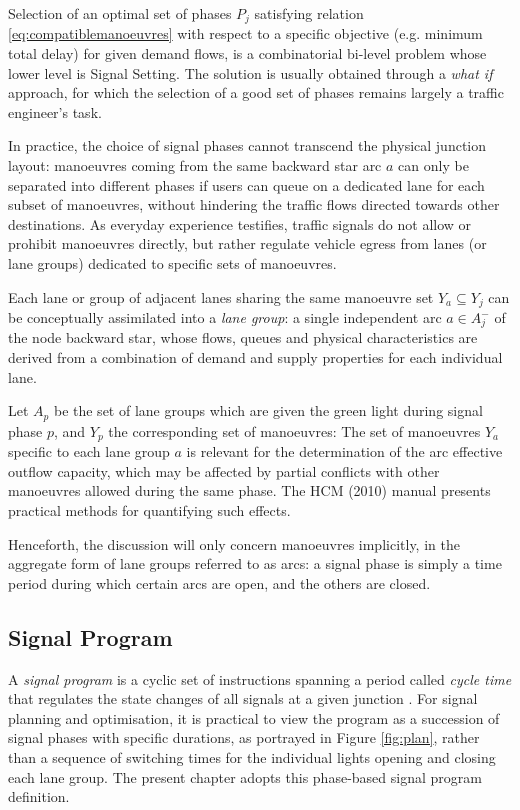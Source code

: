 Selection of an optimal set of phases $P_j$ satisfying relation \eqref{eq:compatiblemanoeuvres} with respect to a specific objective (e.g. minimum total delay) for given demand flows, is a combinatorial bi-level problem whose lower level is Signal Setting. The solution is usually obtained through a \emph{what if} approach, for which the selection of a good set of phases remains largely a traffic engineer’s task.

In practice, the choice of signal phases cannot transcend the physical junction layout: manoeuvres coming from the same backward star arc $a$ can only be separated into different phases if users can queue on a dedicated lane for each subset of manoeuvres, without hindering the traffic flows directed towards other destinations.
As everyday experience testifies, traffic signals do not allow or prohibit manoeuvres directly, but rather regulate vehicle egress from lanes (or lane groups) dedicated to specific sets of manoeuvres.

Each lane or group of adjacent lanes sharing the same manoeuvre set $Y_a \subseteq Y_j$ can be conceptually assimilated into a  \emph{lane group}: a single independent arc $a \in A^{-}_{j}$ of the node backward star, whose flows, queues and physical characteristics are derived from a combination of demand and supply properties for each individual lane.
 
Let $A_p$ be the set of lane groups which are given the green light during signal phase $p$, and $Y_p$ the corresponding set of manoeuvres:
The set of manoeuvres $Y_a$ specific to each lane group $a$ is relevant for the determination of the arc effective outflow capacity, which may be affected by partial conflicts with other manoeuvres allowed during the same phase. The HCM (2010) manual presents practical methods for quantifying such effects.

Henceforth, the discussion will only concern manoeuvres implicitly, in the aggregate form of lane groups referred to as arcs: a signal phase is simply a time period during which certain arcs are open, and the others are closed.

\subsection{Signal Program}
A \emph{signal program} is a cyclic set of instructions spanning a period called \emph{cycle time} that regulates the state changes of all signals at a given junction .
For signal planning and optimisation, it is practical to view the program as a succession of signal phases with specific durations, as portrayed in Figure \ref{fig:plan}, rather than a sequence of switching times for the individual lights opening and closing each lane group. The present chapter adopts this phase-based signal program definition.

